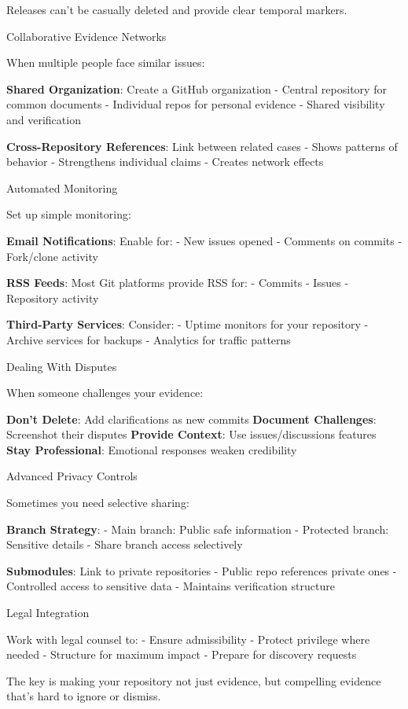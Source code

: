 Releases can't be casually deleted and provide clear temporal markers.

Collaborative Evidence Networks

When multiple people face similar issues:

\textbf{Shared Organization}: Create a GitHub organization - Central
repository for common documents - Individual repos for personal evidence
- Shared visibility and verification

\textbf{Cross-Repository References}: Link between related cases - Shows
patterns of behavior - Strengthens individual claims - Creates network
effects

Automated Monitoring

Set up simple monitoring:

\textbf{Email Notifications}: Enable for: - New issues opened - Comments
on commits - Fork/clone activity

\textbf{RSS Feeds}: Most Git platforms provide RSS for: - Commits -
Issues - Repository activity

\textbf{Third-Party Services}: Consider: - Uptime monitors for your
repository - Archive services for backups - Analytics for traffic
patterns

Dealing With Disputes

When someone challenges your evidence:

\textbf{Don't Delete}: Add clarifications as new commits
\textbf{Document Challenges}: Screenshot their disputes \textbf{Provide
Context}: Use issues/discussions features \textbf{Stay Professional}:
Emotional responses weaken credibility

Advanced Privacy Controls

Sometimes you need selective sharing:

\textbf{Branch Strategy}: - Main branch: Public safe information -
Protected branch: Sensitive details - Share branch access selectively

\textbf{Submodules}: Link to private repositories - Public repo
references private ones - Controlled access to sensitive data -
Maintains verification structure

Legal Integration

Work with legal counsel to: - Ensure admissibility - Protect privilege
where needed - Structure for maximum impact - Prepare for discovery
requests

The key is making your repository not just evidence, but compelling
evidence that's hard to ignore or dismiss.

